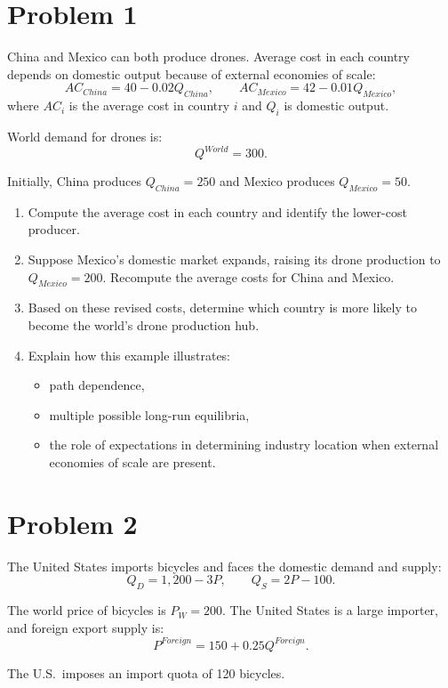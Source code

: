 \documentclass[12pt]{article}
\begin{document}
\newpage

\section*{Problem 1}

China and Mexico can both produce drones. Average cost in each country depends on domestic output because of external economies of scale:
\[
AC_{China} = 40 - 0.02Q_{China}, \qquad AC_{Mexico} = 42 - 0.01Q_{Mexico},
\]
where $AC_i$ is the average cost in country $i$ and $Q_i$ is domestic output.

World demand for drones is:
\[
Q^{World} = 300.
\]

Initially, China produces $Q_{China} = 250$ and Mexico produces $Q_{Mexico} = 50$.

\begin{enumerate}[label=(\arabic*)]
\item Compute the average cost in each country and identify the lower-cost producer.
\item Suppose Mexico’s domestic market expands, raising its drone production to $Q_{Mexico} = 200$. Recompute the average costs for China and Mexico.
\item Based on these revised costs, determine which country is more likely to become the world’s drone production hub.
\item Explain how this example illustrates:
\begin{itemize}
    \item path dependence,
    \item multiple possible long-run equilibria,
    \item the role of expectations in determining industry location when external economies of scale are present.
\end{itemize}
\end{enumerate}


\newpage
\section*{Problem 2 }

The United States imports bicycles and faces the domestic demand and supply:
\[
Q_D = 1{,}200 - 3P, \qquad Q_S = 2P - 100.
\]

The world price of bicycles is $P_W = 200$.  
The United States is a large importer, and foreign export supply is:
\[
P^{Foreign} = 150 + 0.25Q^{Foreign}.
\]

The U.S.\ imposes an import quota of 120 bicycles.
\end{document}
